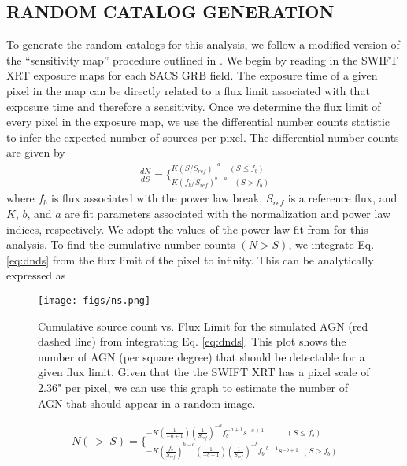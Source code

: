 \documentclass[preprint]{aastex63}
\begin{document}
\subsection{RANDOM CATALOG GENERATION}
To generate the random catalogs for this analysis, we follow a modified version
 of the ``sensitivity map'' procedure outlined in \cite{koutoulidis_2}.
We begin by reading in the SWIFT XRT exposure maps for each SACS GRB field. The exposure time of a given pixel in the map can be directly related to a flux limit associated
with that exposure time and therefore a sensitivity. Once we determine the flux limit of every pixel in the exposure map, we use the
differential number counts statistic to infer the expected number of sources per pixel. The differential number counts
are given by 
\begin{align}
    \label{eq:dnds}
    \frac{dN}{dS} = \bigg\{^{K(S/S_{ref})^{-a} \ \  \ \ \ (S \leq f_b)}_{K(f_b/S_{ref})^{b-a} \ \ \ \ (S > f_b)}
\end{align}
where $f_b$ is flux associated with the power law break, $S_{ref}$ is a reference flux, 
and $K$, $b$, and $a$ are fit parameters associated with the normalization and power law indices, respectively.
We adopt the values  of the power law fit from \cite{dai_2015} for this analysis. To find the cumulative number counts $(N>S)$, we 
integrate Eq. \ref{eq:dnds} from the flux limit of the pixel to infinity. This can be analytically expressed as

\begin{figure}[!ht]
    \centering
    \texttt{[image: figs/ns.png]}
    \label{fig:ns}
    \caption{Cumulative source count vs. Flux Limit for the simulated AGN (red dashed line) 
    from integrating Eq. \ref{eq:dnds}. This plot shows the number of AGN (per square degree) that should
    be detectable for a given flux limit. Given that the the SWIFT XRT has a pixel scale of 2.36" per pixel, we can 
    use this graph to estimate the number of AGN that should appear in a random image.}
\end{figure}

\begin{align}
    \label{eq:nss}
    N( \ > \ S ) = \bigg\{^{-K\left(\frac{1}{-a+1}\right)\left(\frac{1}{S_{ref}}\right)^{-a}f_b^{-a+1}s^{-a+1} \ \ \ \ \ \ \ \ \ \ \ \ \ (S \leq f_b)}_
    {-K \left(\frac{f_b}{S_{ref}}\right)^{b-a}\left(\frac{1}{-b+1}\right)\left(\frac{1}{S_{ref}}\right)^{-b}f_b^{-b+1}s^{-b+1} \ \ (S > f_b)}
\end{align}
\end{document}
